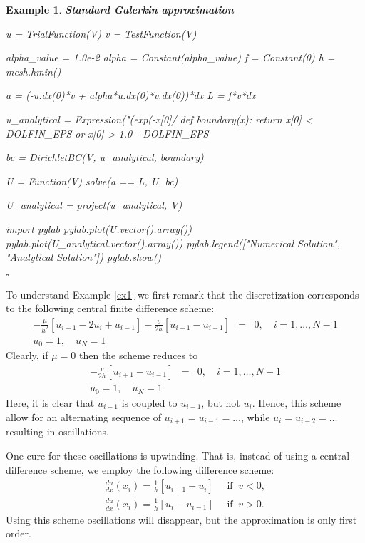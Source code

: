 \documentclass[a4paper,11pt]{amsart}
\newtheorem{example}{Example}[section]
\begin{document}
\begin{example}{\textbf{Standard Galerkin approximation}}
\begin{python}
  u = TrialFunction(V)
  v = TestFunction(V)

  alpha_value = 1.0e-2 
  alpha = Constant(alpha_value)
  f = Constant(0)
  h = mesh.hmin()

  a = (-u.dx(0)*v + alpha*u.dx(0)*v.dx(0))*dx  
  L = f*v*dx  

  u_analytical = Expression("(exp(-x[0]/%
  def boundary(x):
      return x[0] < DOLFIN_EPS or x[0] > 1.0 - DOLFIN_EPS

  bc = DirichletBC(V, u_analytical, boundary) 

  U = Function(V)
  solve(a == L, U, bc) 

  U_analytical = project(u_analytical, V)

  import pylab 
  pylab.plot(U.vector().array())
  pylab.plot(U_analytical.vector().array())
  pylab.legend(["Numerical Solution", "Analytical Solution"])
  pylab.show()
\end{python}
$\square$ 
\end{example}

To understand Example \ref{ex1} we first remark that the discretization corresponds to the following 
central finite difference scheme: 
\begin{eqnarray*}
-\frac{\mu}{h^2}\left[u_{i+1}-2u_i+u_{i-1}\right] - 
\frac{v}{2h}\left[u_{i+1}-u_{i-1}\right] &=& 0, \quad i=1,\ldots,N-1\\
u_0=1,\quad u_N=1 &&
\end{eqnarray*}
Clearly, if $\mu=0$ then the scheme reduces to  
\begin{eqnarray*}
-\frac{v}{2h}\left[u_{i+1}-u_{i-1}\right] &=& 0, \quad i=1,\ldots,N-1\\
u_0=1,\quad u_N=1 &&
\end{eqnarray*}
Here, it is clear that $u_{i+1}$ is coupled to $u_{i-1}$, but not 
$u_{i}$. Hence, this scheme allow for an alternating
sequence of $u_{i+1}=u_{i-1}=\ldots$, while $u_{i}=u_{i-2}=\ldots$
resulting in oscillations. 

One cure for these oscillations is upwinding. That is, instead
of using a central difference scheme, we employ the following difference
scheme:   
\begin{eqnarray*}
\frac{du}{dx} (x_i) = \frac{1}{h}[u_{i+1}-u_{i}] \quad   \mbox{ if } \ v < 0, \\ 
\frac{du}{dx} (x_i) = \frac{1}{h}[u_{i}-u_{i-1}] \quad  \mbox{ if } \ v > 0 .  
\end{eqnarray*}
Using this scheme oscillations will disappear, but the approximation is only first order.
\end{document}
